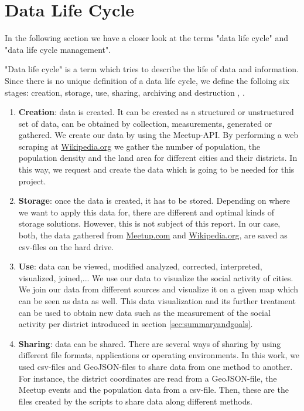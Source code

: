 \section{Data Life Cycle}\label{sec:datalifecycle}


In the following section we have a closer look at the terms "data life cycle" and "data life cycle management".

"Data life cycle" is a term which tries to describe the life of data and information. Since there is no unique definition of a data life cycle, we define the folloing six stages: creation, storage, use, sharing, archiving and destruction  \cite{marburg}, \cite{spirion}.

\begin{enumerate}
	\item \textbf{Creation}: data is created. It can be created as a structured or unstructured set of data, can be obtained by collection, measurements, generated or gathered. We create our data by using the Meetup-API. By performing a web scraping at \url{Wikipedia.org} we gather the number of population, the population density and the land area for different cities and their districts. In this way, we request and create the data which is going to be needed for this project.
	\item \textbf{Storage}: once the data is created, it has to be stored. Depending on where we want to apply this data for, there are different and optimal kinds of storage solutions. However, this is not subject of this report. In our case, both, the data gathered from \url{Meetup.com} and \url{Wikipedia.org}, are saved as csv-files on the hard drive.
	\item \textbf{Use}: data can be viewed, modified analyzed, corrected, interpreted, visualized, joined,... We use our data to visualize the social activity of cities. We join our data from different sources and visualize it on a given map which can be seen as data as well. This data visualization and its further treatment can be used to obtain new data such as the measurement of the social activity per district introduced in section \ref{sec:summaryandgoals}.
	\item \textbf{Sharing}: data can be shared. There are several ways of sharing by using different file formats, applications or operating environments. In this work, we used csv-files and GeoJSON-files to share data from one method to another. For instance, the district coordinates are read from a GeoJSON-file, the Meetup events and the population data from a csv-file. Then, these are the files created by the scripts to share data along different methods.

\end{enumerate}
